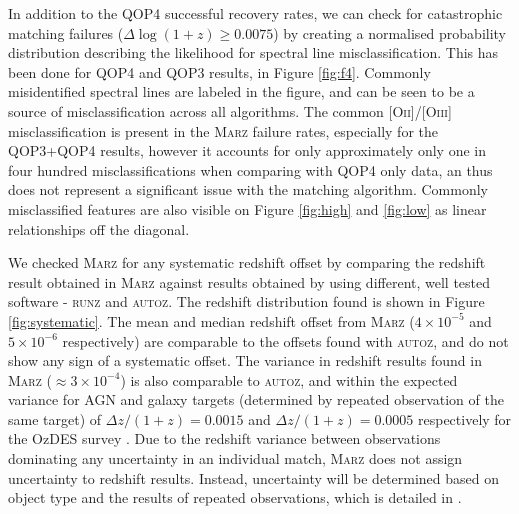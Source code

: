 \documentclass[5p]{elsarticle}
\newcommand{\runz}{\textsc{runz}}
\newcommand{\autoz}{\textsc{autoz}}
\newcommand{\marz}{\textsc{Marz}}
\begin{document}
In addition to the QOP4 successful recovery rates, we can check for catastrophic matching failures ($\Delta \log(1+z) \geq 0.0075$) by creating a normalised probability distribution describing the likelihood for spectral line misclassification. This has been done for QOP4 and QOP3 results, in Figure \ref{fig:f4}. Commonly misidentified spectral lines are labeled in the figure, and can be seen to be a source of misclassification across all algorithms. The common [O\textsc{ii}]/[O\textsc{iii}] misclassification is present in the \marz{} failure rates, especially for the QOP3+QOP4 results, however it accounts for only approximately only one in four hundred misclassifications when comparing with QOP4 only data, an thus does not represent a significant issue with the matching algorithm. Commonly misclassified features are also visible on Figure \ref{fig:high} and \ref{fig:low} as linear relationships off the diagonal.

We checked \marz{} for any systematic redshift offset by comparing the redshift result obtained in \marz{} against results obtained by using different, well tested software - \runz{} and \autoz{}. The redshift distribution found is shown in Figure \ref{fig:systematic}. The mean and median redshift offset from \marz{} ($4\times10^{-5}$ and $5\times10^{-6}$ respectively) are comparable to the offsets found with \autoz{}, and do not show any sign of a systematic offset. The variance in redshift results found in \marz{} ($\approx 3 \times 10^{-4}$) is also comparable to \autoz{}, and within the expected variance for AGN and galaxy targets (determined by repeated observation of the same target) of $\Delta z/(1+z) = 0.0015$ and $\Delta z/(1+z) = 0.0005$ respectively for the OzDES survey \citep{fang2015}. Due to the redshift variance between observations dominating any uncertainty in an individual match, \marz{} does not assign uncertainty to redshift results. Instead, uncertainty will be determined based on object type and the results of repeated observations, which is detailed in \citet[Table 4]{fang2015}.\\
\end{document}
